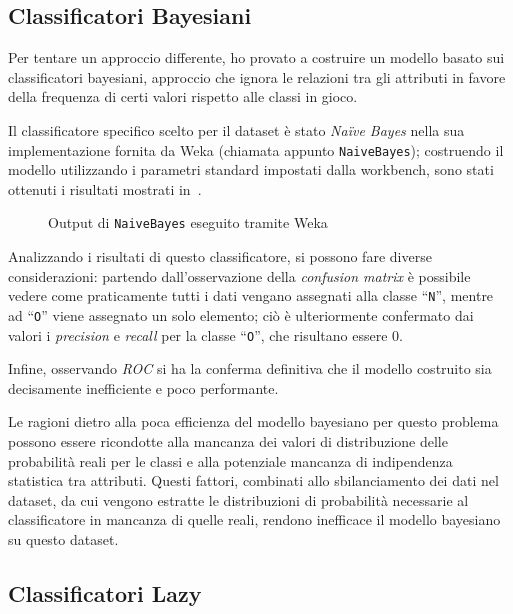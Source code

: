 \subsection{Classificatori Bayesiani}

Per tentare un approccio differente, ho provato a costruire un modello basato sui classificatori bayesiani,
approccio che ignora le relazioni tra gli attributi in favore della frequenza di certi valori rispetto alle classi in gioco.

Il classificatore specifico scelto per il dataset è stato \emph{Naïve Bayes} nella sua implementazione fornita da Weka (chiamata appunto \texttt{NaiveBayes});
costruendo il modello utilizzando i parametri standard impostati dalla workbench, sono stati ottenuti i risultati mostrati in~.

\begin{figure}[H]
  \centering
  \caption{Output di \texttt{NaiveBayes} eseguito tramite Weka}%
  \label{fig:bayes}
\end{figure}

Analizzando i risultati di questo classificatore, si possono fare diverse considerazioni:
partendo dall'osservazione della \emph{confusion matrix} è possibile vedere come praticamente tutti i dati vengano assegnati alla classe ``\texttt{N}'', mentre ad ``\texttt{O}'' viene assegnato un solo elemento;
ciò è ulteriormente confermato dai valori i \emph{precision} e \emph{recall} per la classe ``\texttt{O}'', che risultano essere 0.

Infine, osservando \emph{ROC} si ha la conferma definitiva che il modello costruito sia decisamente inefficiente e poco performante.

Le ragioni dietro alla poca efficienza del modello bayesiano per questo problema possono essere ricondotte alla mancanza dei valori di distribuzione delle probabilità reali per le classi e alla potenziale mancanza di indipendenza statistica tra attributi.
Questi fattori, combinati allo sbilanciamento dei dati nel dataset, da cui vengono estratte le distribuzioni di probabilità necessarie al classificatore in mancanza di quelle reali, rendono inefficace il modello bayesiano su questo dataset.

\subsection{Classificatori Lazy}

